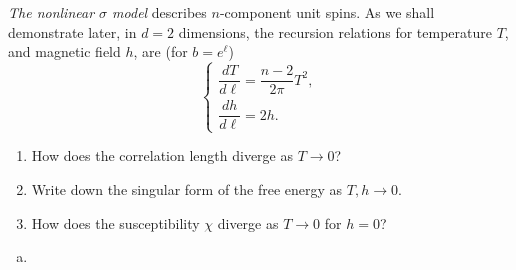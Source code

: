 \begin{problem}
    \textit{The nonlinear $\sigma$ model} describes $n$-component unit spins. As we shall demonstrate later, in $d = 2$ dimensions, the recursion relations for temperature $T$, and magnetic field $h$, are (for $b = e^\ell$)
    \[
        \begin{cases}
            \dfrac{dT}{d\ell} = \dfrac{n-2}{2\pi}T^2, \\[6pt]
            \dfrac{dh}{d\ell} = 2h.
        \end{cases}
    \]

    \begin{enumerate}
        \item[(a)] How does the correlation length diverge as $T \to 0$?

        \item[(b)] Write down the singular form of the free energy as $T, h \to 0$.

        \item[(c)] How does the susceptibility $\chi$ diverge as $T \to 0$ for $h = 0$?
    \end{enumerate}
\end{problem}

\begin{solution}
    \begin{enumerate}[(a)]
        \item
    \end{enumerate}
\end{solution}

